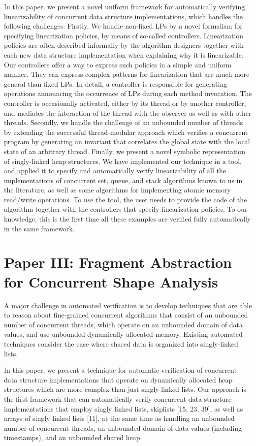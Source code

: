 In this paper, we present a novel uniform framework for automatically
verifying linearizability of concurrent data structure implementations, which handles the following challenges: Firstly, We handle non-fixed LPs by a novel formalism for specifying linearization policies, by means of so-called controllers. Linearization policies are often described informally by the algorithm designers together with each new data structure implementation when explaining why it is linearizable. Our controllers offer a way to express such policies in a simple and uniform manner. They can express complex patterns for linearization that are much more general than fixed LPs. In detail, a
controller is responsible for generating operations announcing the occurrence of
LPs during each method invocation. The controller is occasionally activated, either by
its thread or by another controller, and mediates the interaction of the thread with the
observer as well as with other threads. Secondly, we handle the challenge of an unbounded number of threads by extending the successful thread-modular approach which verifies a concurrent program by generating an invariant that correlates the global state with the local state of an arbitrary thread. Finally,  we present a novel symbolic representation of singly-linked heap structures.
We have implemented our technique in a tool, and applied it to specify and automatically verify linearizability of all the implementations of concurrent set, queue,
and stack algorithms known to us in the literature, as well as some algorithms for implementing atomic memory read/write operations. To use the tool, the user needs to
provide the code of the algorithm together with the controllers that specify linearization
policies. To our knowledge, this is the first time all these examples are verified fully
automatically in the same framework.
\section{Paper III: Fragment Abstraction for Concurrent Shape Analysis}  
A major challenge in automated verification is to develop techniques
that are able to reason about fine-grained concurrent algorithms that consist of
an unbounded number of concurrent threads, which operate on an unbounded
domain of data values, and use unbounded dynamically allocated memory. Existing automated techniques consider the case where shared data is organized into
singly-linked lists.

In this paper, we present a technique for automatic verification of concurrent data structure implementations that operate on dynamically allocated heap structures which are more complex than just singly-linked lists. Our approach is the first
framework that can automatically verify concurrent data structure implementations that
employ singly linked lists, skiplists [15, 23, 39], as well as arrays of singly linked
lists [11], at the same time as handling an unbounded number of concurrent threads,
an unbounded domain of data values (including timestamps), and an unbounded shared
heap.

